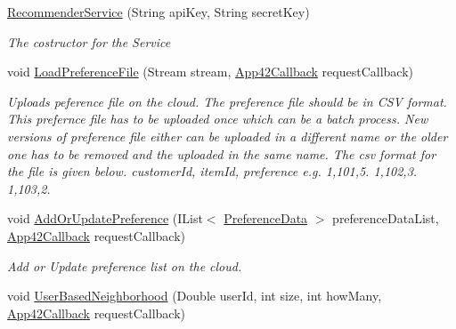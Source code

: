 \begin{DoxyCompactItemize}
\item 
\hyperlink{classcom_1_1shephertz_1_1app42_1_1paas_1_1sdk_1_1windows_1_1recommend_1_1_recommender_service_a512a00cb27c9ee1e7fd420e4946f79b6}{Recommender\+Service} (String api\+Key, String secret\+Key)
\begin{DoxyCompactList}\small\item\em The costructor for the Service \end{DoxyCompactList}\item 
void \hyperlink{classcom_1_1shephertz_1_1app42_1_1paas_1_1sdk_1_1windows_1_1recommend_1_1_recommender_service_ac39b2ab6eb82c8ad98e36fb59e89beb8}{Load\+Preference\+File} (Stream stream, \hyperlink{interfacecom_1_1shephertz_1_1app42_1_1paas_1_1sdk_1_1windows_1_1_app42_callback}{App42\+Callback} request\+Callback)
\begin{DoxyCompactList}\small\item\em Uploads peference file on the cloud. The preference file should be in C\+S\+V format. This prefernce file has to be uploaded once which can be a batch process. New versions of preference file either can be uploaded in a different name or the older one has to be removed and the uploaded in the same name. The csv format for the file is given below. customer\+Id, item\+Id, preference e.\+g. 1,101,5. 1,102,3. 1,103,2. \end{DoxyCompactList}\item 
void \hyperlink{classcom_1_1shephertz_1_1app42_1_1paas_1_1sdk_1_1windows_1_1recommend_1_1_recommender_service_a5774fe7a5f6cdcdd40dcaff66ed33704}{Add\+Or\+Update\+Preference} (I\+List$<$ \hyperlink{classcom_1_1shephertz_1_1app42_1_1paas_1_1sdk_1_1windows_1_1recommend_1_1_preference_data}{Preference\+Data} $>$ preference\+Data\+List, \hyperlink{interfacecom_1_1shephertz_1_1app42_1_1paas_1_1sdk_1_1windows_1_1_app42_callback}{App42\+Callback} request\+Callback)
\begin{DoxyCompactList}\small\item\em Add or Update preference list on the cloud. \end{DoxyCompactList}\item 
void \hyperlink{classcom_1_1shephertz_1_1app42_1_1paas_1_1sdk_1_1windows_1_1recommend_1_1_recommender_service_a9f336a4346e92a7e517841475ba38e2c}{User\+Based\+Neighborhood} (Double user\+Id, int size, int how\+Many, \hyperlink{interfacecom_1_1shephertz_1_1app42_1_1paas_1_1sdk_1_1windows_1_1_app42_callback}{App42\+Callback} request\+Callback)

\end{DoxyCompactItemize}

